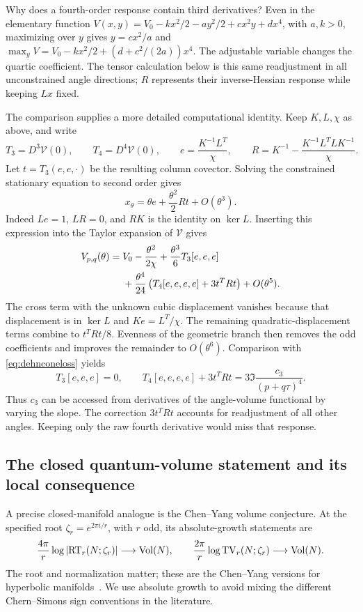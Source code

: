 Why does a fourth-order response contain third derivatives?
Even in the elementary function
$V(x,y)=V_0-kx^2/2-ay^2/2+cx^2y+dx^4$, with $a,k>0$,
maximizing over $y$ gives $y=cx^2/a$ and
$\max_yV=V_0-kx^2/2+(d+c^2/(2a))x^4$.
The adjustable variable changes the quartic coefficient.
The tensor calculation below is this same readjustment in all
unconstrained angle directions; $R$ represents their inverse-Hessian
response while keeping $Lx$ fixed.

The comparison supplies a more detailed computational identity.
Keep $K,L,\chi$ as above, and write
\[
 T_3=D^3\mathscr V(0),\qquad T_4=D^4\mathscr V(0),\qquad
 e=\frac{K^{-1}L^T}{\chi},\qquad
 R=K^{-1}-\frac{K^{-1}L^TLK^{-1}}{\chi}.
\]
Let $t=T_3(e,e,\cdot)$ be the resulting column covector. Solving
the constrained stationary equation to second order gives
\[
 x_\theta=\theta e+\frac{\theta^2}{2}Rt+O(\theta^3).
\]
Indeed $Le=1$, $LR=0$, and $RK$ is the identity on
$\ker L$. Inserting this expression into the Taylor expansion of
$\mathscr V$ gives
\begin{align}
 V_{p,q}(\theta)={}&V_0-\frac{\theta^2}{2\chi}
  +\frac{\theta^3}{6}T_3[e,e,e]\notag\\
  &+\frac{\theta^4}{24}
       \left(T_4[e,e,e,e]+3t^TRt\right)+O(\theta^5).
 \label{eq:dehnquartictensors}
\end{align}
The cross term with the unknown cubic displacement vanishes because
that displacement is in $\ker L$ and $Ke=L^T/\chi$.
The remaining quadratic-displacement terms combine to $t^TRt/8$.
Evenness of the geometric branch then removes the odd coefficients
and improves the remainder to $O(\theta^6)$. Comparison with
\eqref{eq:dehnconeloss} yields
\begin{equation}
 \boxed{T_3[e,e,e]=0,\qquad
 T_4[e,e,e,e]+3t^TRt
      =3\Im\frac{c_3}{(p+q\tau)^4}.}
 \label{eq:dehnquarticdictionary}
\end{equation}
Thus $c_3$ can be accessed from derivatives of the angle-volume
functional by varying the slope. The correction $3t^TRt$ accounts
for readjustment of all other angles. Keeping only the raw fourth
derivative would miss that response.

\subsection{The closed quantum-volume statement and its local consequence}

A precise closed-manifold analogue is the Chen--Yang volume conjecture.
At the specified root $\zeta_r=e^{2\pi i/r}$, with $r$ odd, its
absolute-growth statements are
\begin{equation}
 \frac{4\pi}{r}\log|\mathrm{RT}_r(N;\zeta_r)|\longrightarrow\operatorname{Vol}(N),
 \qquad
 \frac{2\pi}{r}\log\mathrm{TV}_r(N;\zeta_r)\longrightarrow\operatorname{Vol}(N).
 \label{eq:closedquantumvolume}
\end{equation}
The root and normalization matter; these are the Chen--Yang versions
for hyperbolic manifolds~\cite{ChenYang}. We use absolute growth
to avoid mixing the different Chern--Simons sign conventions in
the literature.

